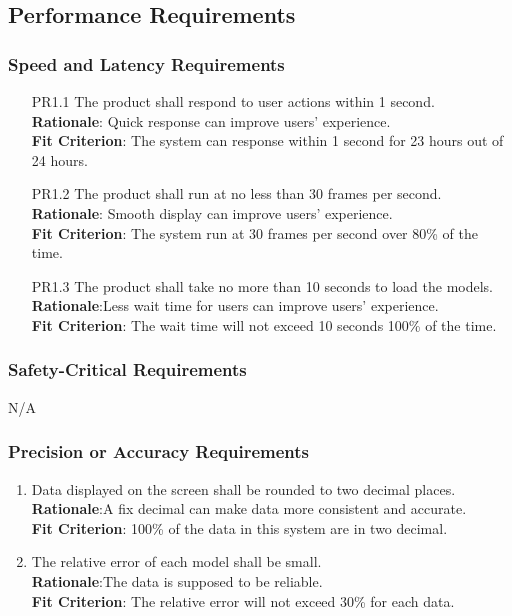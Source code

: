 \documentclass{article}
\begin{document}
\subsection{Performance Requirements}
\subsubsection{Speed and Latency Requirements}
\begin{enumerate}
    \item[PR1.1] The product shall respond to user actions within 1 second.\\
    \textbf{Rationale}: Quick response can improve users' experience.\\
    \textbf{Fit Criterion}: The system can response within 1 second for 23 hours out of 24 hours.
    
    \item[PR1.2] The product shall run at no less than 30 frames per second.\\
    \textbf{Rationale}: Smooth display can improve users' experience.\\
    \textbf{Fit Criterion}: The system run at 30 frames per second over 80\% of the time.
    
    \item[PR1.3] The product shall take no more than 10 seconds to load the models.\\
    \textbf{Rationale}:Less wait time for users can improve users' experience.\\
    \textbf{Fit Criterion}: The wait time will not exceed 10 seconds 100\% of the time.
\end{enumerate}
\subsubsection{Safety-Critical Requirements}
N/A
\subsubsection{Precision or Accuracy Requirements}
\begin{enumerate}[PR3.1]
    \item Data displayed on the screen shall be rounded to two decimal places.\\
    \textbf{Rationale}:A fix decimal can make data more consistent and accurate.\\
    \textbf{Fit Criterion}: 100\% of the data in this system are in two decimal.
    
    \item The relative error of each model shall be small.\\
    \textbf{Rationale}:The data is supposed to be reliable.\\
    \textbf{Fit Criterion}: The relative error will not exceed 30\% for each data.
\end{enumerate}
\end{document}
